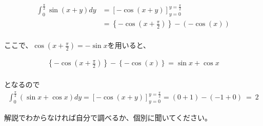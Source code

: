 \documentclass[dvipdfmx,uplatex]{jsarticle}
\begin{document}
\begin{align*}
    \int_0^{\frac{\pi}{2}} \sin(x+y) dy &= \left[-\cos(x+y)\right]_{y = 0}^{y = \frac{\pi}{2}} \\
    &= \left\{-\cos(x + \frac{\pi}{2})\right\} - \left(-\cos(x)\right) \\
\end{align*}

ここで、$ \displaystyle \cos\left(x + \frac{\pi}{2}\right) = -\sin{x}$を用いると、

\begin{align*}
    \left\{-\cos(x + \frac{\pi}{2})\right\} - \left\{-\cos(x)\right\}  = \sin{x} + \cos{x}\\
\end{align*}

となるので \\

\begin{align*}
    \int_0^{\frac{\pi}{2}} (\sin{x} + \cos{x}) dy = \left[- \cos(x+y)\right]_{y = 0}^{y = \frac{\pi}{2}}
    = (0 + 1)-(-1+0) ~=~ 2
\end{align*}

\begin{boxnote}
    \begin{center}
        解説でわからなければ自分で調べるか、個別に聞いてください。
    \end{center}
\end{boxnote}
\end{document}
